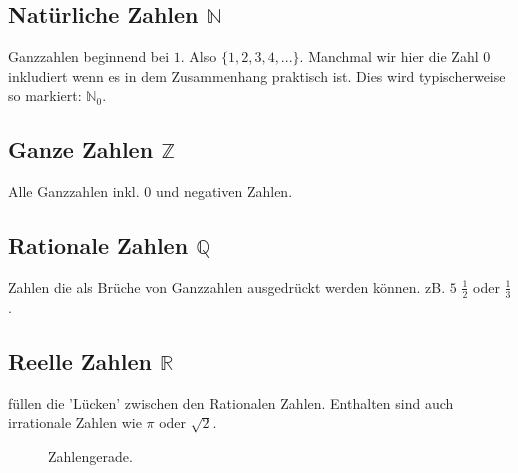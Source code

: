 \subsection{Natürliche Zahlen $\mathbb{N}$}
Ganzzahlen beginnend bei $1$. Also $\{1,2,3,4,...\}$. Manchmal wir hier die Zahl $0$ inkludiert wenn es in dem Zusammenhang praktisch ist. Dies wird typischerweise so markiert: $\mathbb{N}_0$.  
\subsection{Ganze Zahlen $\mathbb{Z}$}
Alle Ganzzahlen inkl. $0$ und negativen Zahlen.
\subsection{Rationale Zahlen $\mathbb{Q}$}
Zahlen die als Brüche von Ganzzahlen ausgedrückt werden können. zB. $5$ $\frac{1}{2}$ oder $\frac{1}{3}$.

\subsection{Reelle Zahlen $\mathbb{R}$}
 füllen die 'Lücken' zwischen den Rationalen Zahlen. Enthalten sind auch irrationale Zahlen wie $\pi$ oder $\sqrt{2}$.



\begin{figure}[h!]
    \centering
    

    \caption{Zahlengerade.}
    \label{fig:zahlengerade}
\end{figure}


